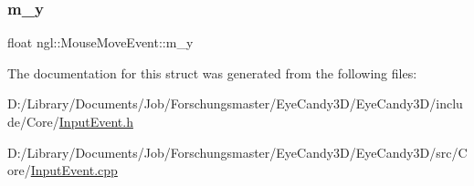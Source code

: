 \subsubsection{\texorpdfstring{m\+\_\+y}{m\_y}}
{\footnotesize\ttfamily float ngl\+::\+Mouse\+Move\+Event\+::m\+\_\+y}



The documentation for this struct was generated from the following files\+:\begin{DoxyCompactItemize}
\item 
D\+:/\+Library/\+Documents/\+Job/\+Forschungsmaster/\+Eye\+Candy3\+D/\+Eye\+Candy3\+D/include/\+Core/\mbox{\hyperlink{_input_event_8h}{Input\+Event.\+h}}\item 
D\+:/\+Library/\+Documents/\+Job/\+Forschungsmaster/\+Eye\+Candy3\+D/\+Eye\+Candy3\+D/src/\+Core/\mbox{\hyperlink{_input_event_8cpp}{Input\+Event.\+cpp}}\end{DoxyCompactItemize}
